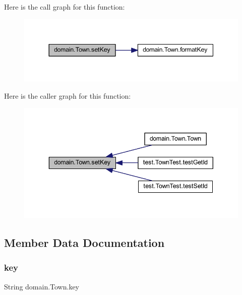 Here is the call graph for this function\+:\nopagebreak
\begin{figure}[H]
\begin{center}
\leavevmode
\includegraphics[width=344pt]{classdomain_1_1_town_abc867cf10f6b9c2f7191317456071ce7_cgraph}
\end{center}
\end{figure}
Here is the caller graph for this function\+:\nopagebreak
\begin{figure}[H]
\begin{center}
\leavevmode
\includegraphics[width=343pt]{classdomain_1_1_town_abc867cf10f6b9c2f7191317456071ce7_icgraph}
\end{center}
\end{figure}


\subsection{Member Data Documentation}
\mbox{\label{classdomain_1_1_town_a7956786ac5d60459ba43fc02938c1a8d}} 
\subsubsection{\texorpdfstring{key}{key}}
{\footnotesize\ttfamily String domain.\+Town.\+key\hspace{0.3cm}{\ttfamily [private]}}

